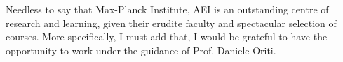 Needless to say that Max-Planck Institute, AEI is an outstanding centre of research and learning, given their erudite faculty and spectacular selection of courses. More specifically, I must add that, I would be grateful to have the opportunity to work under the guidance of Prof. Daniele Oriti.


